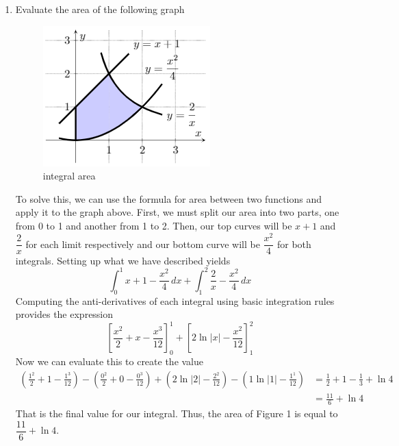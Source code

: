 \documentclass{article}
\begin{document}
\begin{enumerate}[label=\textbf{(6.\arabic*)}]


	\item Evaluate the area of the following graph
	\begin{figure}[H]
		\centering
		\includegraphics[scale=.75]{triginta}
		\caption{integral area}
	\end{figure}

To solve this, we can use the formula for area between two functions and apply it to the graph above. First, we must split our area into two parts, one from 0 to 1 and another from 1 to 2. Then, our top curves will be $x+1$ and $\dfrac{2}{x}$ for each limit respectively and our bottom curve will be $\dfrac{x^2}{4}$ for both integrals. Setting up what we have described yields
\[\int_0^1\!x+1-\frac{x^2}{4}\,dx+\int_1^2\!\frac{2}{x}-\frac{x^2}{4}\,dx\]
Computing the anti-derivatives of each integral using basic integration rules provides the expression
\[\left[\frac{x^2}{2}+x-\frac{x^3}{12}\right]_0^1+\left[2\ln|x|-\frac{x^2}{12}\right]_1^2\]
Now we can evaluate this to create the value
\begin{align*}
\left(\frac{1^2}{2}+1-\frac{1^3}{12}\right)-\left(\frac{0^2}{2}+0-\frac{0^3}{12}\right)+\left(2\ln|2|-\frac{2^2}{12}\right)-\left(1\ln|1|-\frac{1^1}{12}\right) &= \frac{1}{2}+1-\frac{1}{3}+\ln4 \\
&= \frac{11}{6}+\ln4
\end{align*}
That is the final value for our integral. Thus, the area of Figure 1 is equal to $\dfrac{11}{6}+\ln4$.

\newpage


\end{enumerate}
\end{document}
